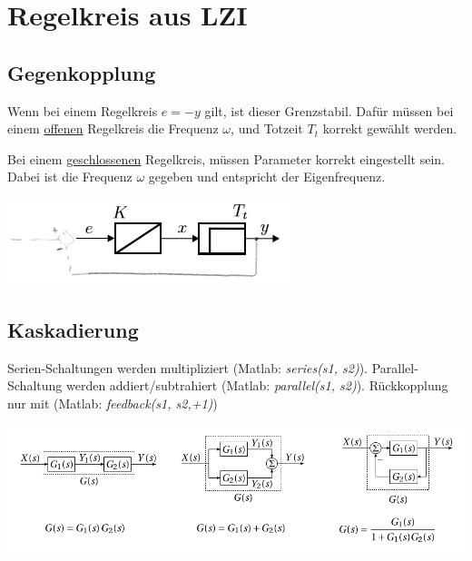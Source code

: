 \section{Regelkreis aus LZI}
\subsection{Gegenkopplung}
 Wenn bei einem Regelkreis $e = -y$ gilt, ist dieser Grenzstabil. Dafür müssen bei einem \underline{offenen} Regelkreis die Frequenz $\omega$, und Totzeit $T_t$ korrekt gewählt werden.

Bei einem \underline{geschlossenen} Regelkreis, müssen Parameter korrekt eingestellt sein. Dabei ist die Frequenz $\omega$ gegeben und entspricht der Eigenfrequenz.
\begin{center}
	\includegraphics[width=0.7\columnwidth]{Images/grenzstabil}
\end{center}


\subsection{Kaskadierung}
Serien-Schaltungen werden multipliziert (Matlab: \textit{series(s1, s2)}). Parallel-Schaltung werden addiert/subtrahiert (Matlab: \textit{parallel(s1, s2)}). Rückkopplung nur mit (Matlab: \textit{feedback(s1, s2,+1)})
\begin{center}
	\includegraphics[width=\columnwidth]{Images/systeme}
\end{center}